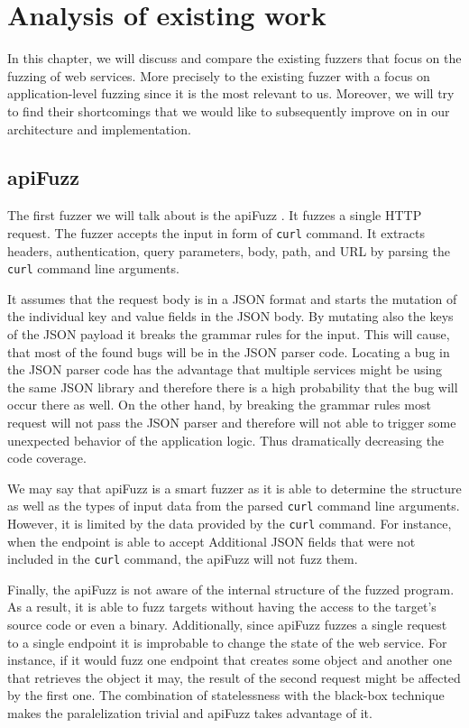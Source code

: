 \chapter{Analysis of existing work}
In this chapter, we will discuss and compare the existing fuzzers that focus on the fuzzing of web services. More precisely to the existing fuzzer with a focus on application-level fuzzing since it is the most relevant to us. \label{sub:Types of fuzzers} Moreover, we will try to find their shortcomings that we would like to subsequently improve on in our architecture and implementation.

\section{apiFuzz}
The first fuzzer we will talk about is the apiFuzz \cite{apiFuzz2020github}. It fuzzes a single HTTP request. The fuzzer accepts the input in form of \texttt{curl} command. It extracts headers, authentication, query parameters, body, path, and URL by parsing the \texttt{curl} command line arguments.

It assumes that the request body is in a JSON format and starts the mutation of the individual key and value fields in the JSON body. By mutating also the keys of the JSON payload it breaks the grammar rules for the input. This will cause, that most of the found bugs will be in the JSON parser code. Locating a bug in the JSON parser code has the advantage that multiple services might be using the same JSON library and therefore there is a high probability that the bug will occur there as well. On the other hand, by breaking the grammar rules most request will not pass the JSON parser and therefore will not able to trigger some unexpected behavior of the application logic. Thus dramatically decreasing the code coverage.

We may say that apiFuzz is a smart fuzzer as it is able to determine the structure as well as the types of input data from the parsed \texttt{curl} command line arguments. However, it is limited by the data provided by the \texttt{curl} command. For instance, when the endpoint is able to accept Additional JSON fields that were not included in the \texttt{curl} command, the apiFuzz will not fuzz them.

Finally, the apiFuzz is not aware of the internal structure of the fuzzed program. As a result, it is able to fuzz targets without having the access to the target's source code or even a binary. Additionally, since apiFuzz fuzzes a single request to a single endpoint it is improbable to change the state of the web service. For instance, if it would fuzz one endpoint that creates some object and another one that retrieves the object it may, the result of the second request might be affected by the first one. The combination of statelessness with the black-box technique makes the paralelization trivial and apiFuzz takes advantage of it.

